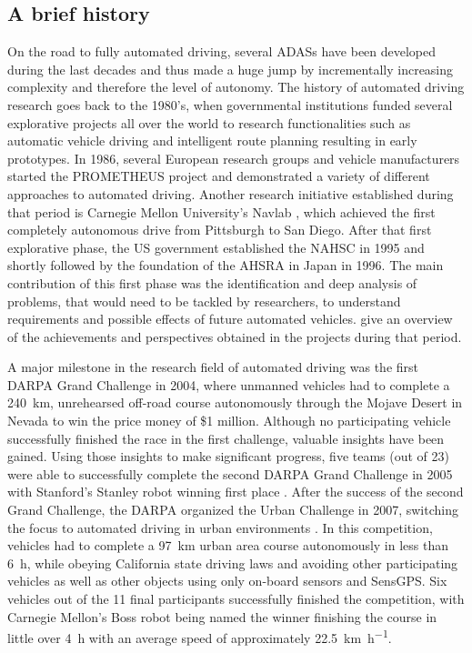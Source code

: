\subsection{A brief history}
\label{subsec:aut_driving_hist}

On the road to fully automated driving, several \acp{ADAS} have been developed during the last decades and thus made a huge jump by incrementally increasing complexity and therefore the level of autonomy.
The history of automated driving research goes back to the 1980's, when governmental institutions funded several explorative projects all over the world to research functionalities such as automatic vehicle driving and intelligent route planning resulting in early prototypes.
In 1986, several European research groups and vehicle manufacturers started the \ac{PROMETHEUS} project \parencite{Dickmanns1990} and demonstrated a variety of different approaches to automated driving.
Another research initiative established during that period is Carnegie Mellon University's Navlab \parencite{Thorpe1988}, which achieved the first completely autonomous drive from Pittsburgh to San Diego.
After that first explorative phase, the US government established the \ac{NAHSC} in 1995 and shortly followed by the foundation of the \ac{AHSRA} in Japan in 1996.
The main contribution of this first phase was the identification and deep analysis of problems, that would need to be tackled by researchers, to understand requirements and possible effects of future automated vehicles.
\textcite{Bertozzi2000} give an overview of the achievements and perspectives obtained in the projects during that period.

A major milestone in the research field of automated driving was the first \ac{DARPA} Grand Challenge in 2004, where unmanned vehicles had to complete a \SI{240}{\kilo\meter}, unrehearsed off-road course autonomously through the Mojave Desert in Nevada to win the price money of \$1 million.
Although no participating vehicle successfully finished the race \parencite{Bacha2004} in the first challenge, valuable insights have been gained.
Using those insights to make significant progress, five teams (out of 23) were able to successfully complete the second \ac{DARPA} Grand Challenge in \num{2005} with Stanford's Stanley robot winning first place \parencite{Thrun2006}.
After the success of the second Grand Challenge, the \ac{DARPA} organized the Urban Challenge in \num{2007}, switching the focus to automated driving in urban environments \parencite{Buehler2009}.
In this competition, vehicles had to complete a \SI{97}{\kilo\meter} urban area course autonomously in less than \SI{6}{\hour}, while obeying California state driving laws and avoiding other participating vehicles as well as other objects using only on-board sensors and \ac{SensGPS}.
Six vehicles out of the 11 final participants successfully finished the competition, with Carnegie Mellon's Boss robot \parencite{Urmson.2008} being named the winner finishing the course in little over \SI{4}{\hour} with an average speed of approximately \SI[per-mode=symbol]{22.5}{\kilo\meter\per\hour}.

